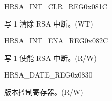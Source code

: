 \begin{register}{H}{RSA\_INT\_CLR\_REG}{0x081C}\label{regdesc:RSAINTCLRREG}
%
%
\regnewline%
\begin{regdesc}\begin{reglist}
\label{fielddesc:RSACLEARINTERRUPT}\item [RSA\_CLEAR\_INTERRUPT] 写 1 清除 RSA 中断。(WT)
\end{reglist}\end{regdesc}
\end{register}


\begin{register}{H}{RSA\_INT\_ENA\_REG}{0x082C}\label{regdesc:RSAINTENAREG}
%
%
\regnewline%
\begin{regdesc}\begin{reglist}
\label{fielddesc:RSAINTENA}\item [RSA\_INT\_ENA] 写 1 使能 RSA 中断。(R/W)
\end{reglist}\end{regdesc}
\end{register}


\begin{register}{H}{RSA\_DATE\_REG}{0x0830}\label{regdesc:RSADATEREG}
%
%
\regnewline%
\begin{regdesc}\begin{reglist}
\label{fielddesc:RSADATE}\item [RSA\_DATE] 版本控制寄存器。(R/W)
\end{reglist}\end{regdesc}
\end{register}
